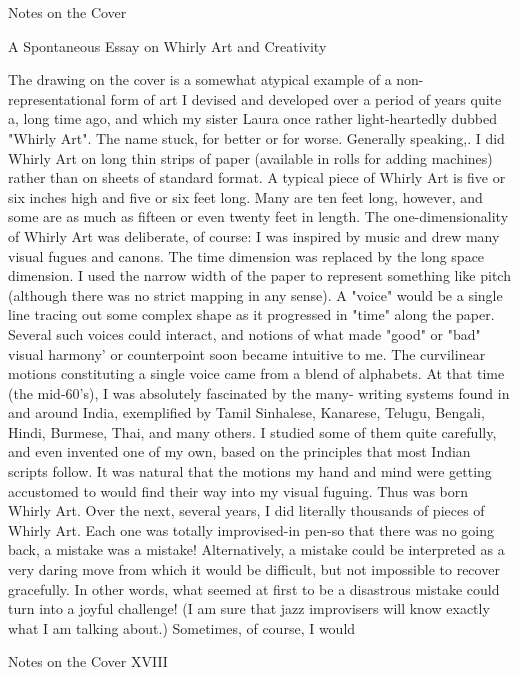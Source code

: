 
                                Notes on the Cover

             A Spontaneous Essay on Whirly Art and Creativity

        The drawing on the cover is a somewhat atypical example of a non-
representational form of art I devised and developed over a period of years quite a,
long time ago, and which my sister Laura once rather light-heartedly dubbed "Whirly
Art". The name stuck, for better or for worse. Generally speaking,. I did Whirly Art
on long thin strips of paper (available in rolls for adding machines) rather than on
sheets of standard format. A typical piece of Whirly Art is five or six inches high and
five or six feet long. Many are ten feet long, however, and some are as much as fifteen
or even twenty feet in length. The one-dimensionality of Whirly Art was deliberate, of
course: I was inspired by music and drew many visual fugues and canons. The time
dimension was replaced by the long space dimension. I used the narrow width of the
paper to represent something like pitch (although there was no strict mapping in any
sense). A "voice" would be a single line tracing out some complex shape as it
progressed in "time" along the paper. Several such voices could interact, and notions
of what made "good" or "bad" visual harmony' or counterpoint soon became intuitive
to me.
        The curvilinear motions constituting a single voice came from a blend of
alphabets. At that time (the mid-60's), I was absolutely fascinated by the many-
writing systems found in and around India, exemplified by Tamil Sinhalese,
Kanarese, Telugu, Bengali, Hindi, Burmese, Thai, and many others. I studied some of
them quite carefully, and even invented one of my own, based on the principles that
most Indian scripts follow. It was natural that the motions my hand and mind were
getting accustomed to would find their way into my visual fuguing. Thus was born
Whirly Art.
        Over the next, several years, I did literally thousands of pieces of Whirly Art.
Each one was totally improvised-in pen-so that there was no going back, a mistake
was a mistake! Alternatively, a mistake could be interpreted as a very daring move
from which it would be difficult, but not impossible to recover gracefully. In other
words, what seemed at first to be a disastrous mistake could turn into a joyful
challenge! (I am sure that jazz improvisers will know exactly what I am talking
about.) Sometimes, of course, I would




Notes on the Cover                                                               XVIII

